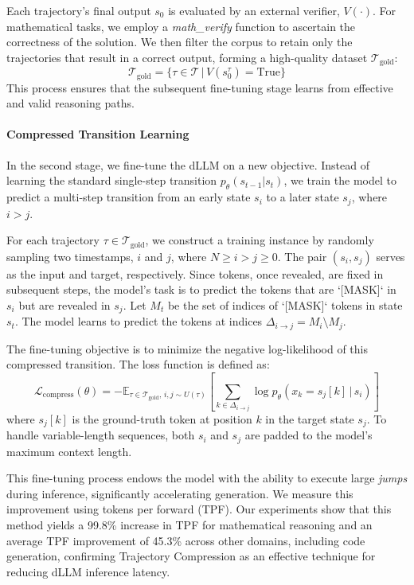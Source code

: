 \documentclass[]{antgroup}
\begin{document}
Each trajectory's final output $s_0$ is evaluated by an external verifier, $V(\cdot)$. For mathematical tasks, we employ a \textit{math\_verify} function to ascertain the correctness of the solution. We then filter the corpus to retain only the trajectories that result in a correct output, forming a high-quality dataset $\mathcal{T}_{\text{gold}}$:
$$
\mathcal{T}_{\text{gold}} = \{ \tau \in \mathcal{T} \,|\, V(s_0^{\tau}) = \text{True} \}
$$
This process ensures that the subsequent fine-tuning stage learns from effective and valid reasoning paths.

\paragraph{Compressed Transition Learning}
In the second stage, we fine-tune the dLLM on a new objective. Instead of learning the standard single-step transition $p_\theta(s_{t-1} | s_t)$, we train the model to predict a multi-step transition from an early state $s_i$ to a later state $s_j$, where $i > j$.

For each trajectory $\tau \in \mathcal{T}_{\text{gold}}$, we construct a training instance by randomly sampling two timestamps, $i$ and $j$, where $N \ge i > j \ge 0$. The pair $(s_i, s_j)$ serves as the input and target, respectively. Since tokens, once revealed, are fixed in subsequent steps, the model's task is to predict the tokens that are `[MASK]` in $s_i$ but are revealed in $s_j$. Let $M_t$ be the set of indices of `[MASK]` tokens in state $s_t$. The model learns to predict the tokens at indices $\Delta_{i \to j} = M_i \setminus M_j$.

The fine-tuning objective is to minimize the negative log-likelihood of this compressed transition. The loss function is defined as:
$$
\mathcal{L}_{\text{compress}}(\theta) = - \mathbb{E}_{\tau \in \mathcal{T}_{\text{gold}}, \, i,j \sim U(\tau)} \left[ \sum_{k \in \Delta_{i \to j}} \log p_\theta(x_k = s_j[k] \,|\, s_i) \right]
$$
where $s_j[k]$ is the ground-truth token at position $k$ in the target state $s_j$. To handle variable-length sequences, both $s_i$ and $s_j$ are padded to the model's maximum context length.

This fine-tuning process endows the model with the ability to execute large  \textit{jumps} during inference, significantly accelerating generation. We measure this improvement using tokens per forward (TPF). Our experiments show that this method yields a 99.8\% increase in TPF for mathematical reasoning and an average TPF improvement of 45.3\% across other domains, including code generation, confirming Trajectory Compression as an effective technique for reducing dLLM inference latency.
\end{document}
